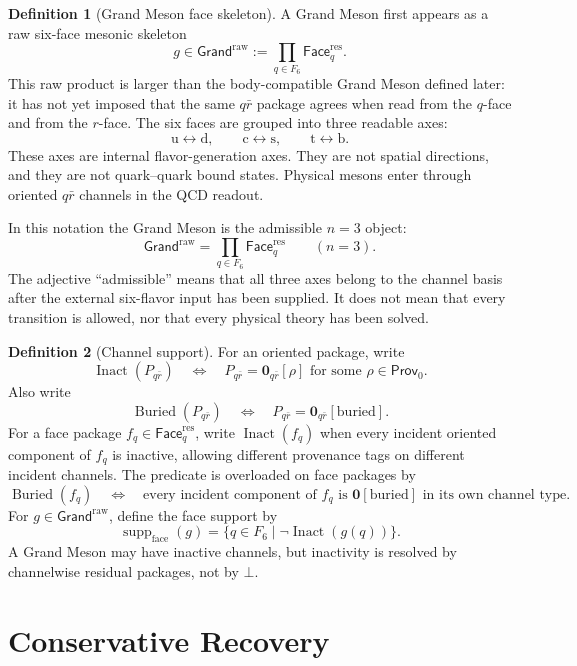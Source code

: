 \documentclass[11pt]{article}
\theoremstyle{definition}
\newtheorem{definition}{Definition}
\theoremstyle{plain}
\DeclareMathOperator{\supp}{supp}
\DeclareMathOperator{\Buried}{Buried}
\DeclareMathOperator{\Inact}{Inact}
\newcommand{\qu}{\mathrm u}
\newcommand{\qd}{\mathrm d}
\newcommand{\qc}{\mathrm c}
\newcommand{\qs}{\mathrm s}
\newcommand{\qt}{\mathrm t}
\newcommand{\qb}{\mathrm b}
\begin{document}
\begin{definition}[Grand Meson face skeleton]
A Grand Meson first appears as a raw six-face mesonic skeleton
\[
  g\in\mathsf{Grand}^{\mathrm{raw}}
  :=
  \prod_{q\in F_6}\mathsf{Face}^{\mathrm{res}}_q .
\]
This raw product is larger than the body-compatible Grand Meson defined
later: it has not yet imposed that the same \(q\bar r\) package agrees when
read from the \(q\)-face and from the \(r\)-face.
The six faces are grouped into three readable axes:
\[
  \qu\leftrightarrow\qd,\qquad
  \qc\leftrightarrow\qs,\qquad
  \qt\leftrightarrow\qb.
\]
These axes are internal flavor-generation axes.  They are not spatial
directions, and they are not quark--quark bound states.  Physical mesons
enter through oriented \(q\bar r\) channels in the QCD readout.
\end{definition}

In this notation the Grand Meson is the admissible \(n=3\) object:
\[
  \mathsf{Grand}^{\mathrm{raw}}
  =
  \prod_{q\in F_6}\mathsf{Face}^{\mathrm{res}}_q
  \qquad(n=3).
\]
The adjective ``admissible'' means that all three axes belong to the
channel basis after the external six-flavor input has been supplied.  It
does not mean that every transition is allowed, nor that every physical
theory has been solved.

\begin{definition}[Channel support]
For an oriented package, write
\[
  \Inact(P_{q\bar r})
  \quad\Longleftrightarrow\quad
  P_{q\bar r}=\mathbf 0_{q\bar r}[\rho]
  \text{ for some }\rho\in\mathsf{Prov}_{0}.
\]
Also write
\[
  \Buried(P_{q\bar r})
  \quad\Longleftrightarrow\quad
  P_{q\bar r}=\mathbf 0_{q\bar r}[\mathrm{buried}].
\]
For a face package \(f_q\in\mathsf{Face}^{\mathrm{res}}_q\), write
\(\Inact(f_q)\) when every incident oriented component of \(f_q\) is
inactive, allowing different provenance tags on different incident
channels.  The predicate is overloaded on face packages by
\[
  \Buried(f_q)
  \quad\Longleftrightarrow\quad
  \text{every incident component of }f_q
  \text{ is }\mathbf 0[\mathrm{buried}]
  \text{ in its own channel type}.
\]
For \(g\in\mathsf{Grand}^{\mathrm{raw}}\), define the face support by
\[
  \supp_{\mathrm{face}}(g)
  =
  \{q\in F_6\mid \neg\Inact(g(q))\}.
\]
A Grand Meson may have inactive channels, but inactivity is resolved by
channelwise residual packages, not by \(\bot\).
\end{definition}

\section{Conservative Recovery}
\end{document}
